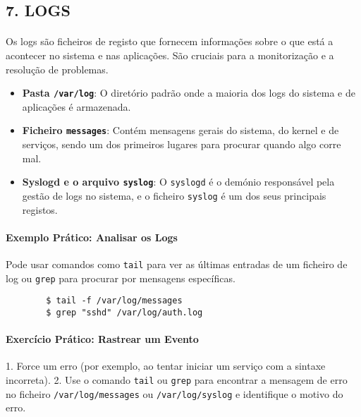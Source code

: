 \documentclass[10pt,a4paper]{article}
\begin{document}
	\subsection*{7. LOGS}
	\vspace{-1.2em}
	\paragraph{}
	Os logs são ficheiros de registo que fornecem informações sobre o que está a acontecer no sistema e nas aplicações. São cruciais para a monitorização e a resolução de problemas.
	
	\begin{itemize}
		\item \textbf{Pasta \texttt{/var/log}}: O diretório padrão onde a maioria dos logs do sistema e de aplicações é armazenada.
		\item \textbf{Ficheiro \texttt{messages}}: Contém mensagens gerais do sistema, do kernel e de serviços, sendo um dos primeiros lugares para procurar quando algo corre mal.
		\item \textbf{Syslogd e o arquivo \texttt{syslog}}: O \texttt{syslogd} é o demónio responsável pela gestão de logs no sistema, e o ficheiro \texttt{syslog} é um dos seus principais registos.
	\end{itemize}
	
	\paragraph{\bfseries Exemplo Prático: Analisar os Logs}
	Pode usar comandos como \texttt{tail} para ver as últimas entradas de um ficheiro de log ou \texttt{grep} para procurar por mensagens específicas.
	
	\begin{verbatim}
		$ tail -f /var/log/messages
		$ grep "sshd" /var/log/auth.log
	\end{verbatim}
	
	\paragraph{\bfseries Exercício Prático: Rastrear um Evento}
	1. Force um erro (por exemplo, ao tentar iniciar um serviço com a sintaxe incorreta).
	2. Use o comando \texttt{tail} ou \texttt{grep} para encontrar a mensagem de erro no ficheiro \texttt{/var/log/messages} ou \texttt{/var/log/syslog} e identifique o motivo do erro.
	
\end{document}
